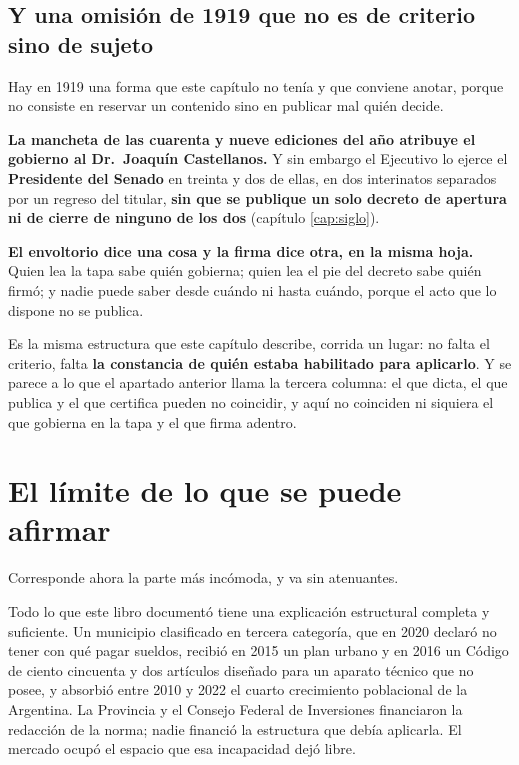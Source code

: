 \subsection*{Y una omisión de 1919 que no es de criterio sino de sujeto}

Hay en 1919 una forma que este capítulo no tenía y que conviene anotar, porque no consiste en
reservar un contenido sino en publicar mal quién decide.

\textbf{La mancheta de las cuarenta y nueve ediciones del año atribuye el gobierno al Dr.\
Joaquín Castellanos.} Y sin embargo el Ejecutivo lo ejerce el \textbf{Presidente del Senado} en
treinta y dos de ellas, en dos interinatos separados por un regreso del titular, \textbf{sin que
se publique un solo decreto de apertura ni de cierre de ninguno de los dos} (capítulo
\ref{cap:siglo}).

\begin{cautela}
\textbf{El envoltorio dice una cosa y la firma dice otra, en la misma hoja.} Quien lea la tapa
sabe quién gobierna; quien lea el pie del decreto sabe quién firmó; y nadie puede saber desde
cuándo ni hasta cuándo, porque el acto que lo dispone no se publica.

Es la misma estructura que este capítulo describe, corrida un lugar: no falta el criterio, falta
\textbf{la constancia de quién estaba habilitado para aplicarlo}. Y se parece a lo que el
apartado anterior llama la tercera columna: el que dicta, el que publica y el que certifica
pueden no coincidir, y aquí no coinciden ni siquiera el que gobierna en la tapa y el que firma
adentro.
\end{cautela}

\section{El límite de lo que se puede afirmar}

Corresponde ahora la parte más incómoda, y va sin atenuantes.

Todo lo que este libro documentó tiene una explicación estructural completa y suficiente. Un municipio clasificado en tercera categoría, que en 2020 declaró no tener con qué pagar sueldos, recibió en 2015 un plan urbano y en 2016 un Código de ciento cincuenta y dos artículos diseñado para un aparato técnico que no posee, y absorbió entre 2010 y 2022 el cuarto crecimiento poblacional de la Argentina. La Provincia y el Consejo Federal de Inversiones financiaron la redacción de la norma; nadie financió la estructura que debía aplicarla. El mercado ocupó el espacio que esa incapacidad dejó libre.

